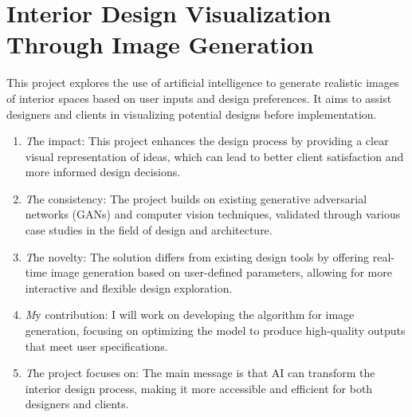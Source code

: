 \documentclass[12pt]{article}
\begin{document}
\section{Interior Design Visualization Through Image Generation}
This project explores the use of artificial intelligence to generate realistic images of interior spaces based on user inputs and design preferences. It aims to assist designers and clients in visualizing potential designs before implementation.
\begin{enumerate}
\item \emph The impact: This project enhances the design process by providing a clear visual representation of ideas, which can lead to better client satisfaction and more informed design decisions.
\item \emph The consistency: The project builds on existing generative adversarial networks (GANs) and computer vision techniques, validated through various case studies in the field of design and architecture.
\item \emph The novelty: The solution differs from existing design tools by offering real-time image generation based on user-defined parameters, allowing for more interactive and flexible design exploration.
\item \emph My contribution: I will work on developing the algorithm for image generation, focusing on optimizing the model to produce high-quality outputs that meet user specifications.
\item \emph The project focuses on: The main message is that AI can transform the interior design process, making it more accessible and efficient for both designers and clients.
\end{enumerate}
\end{document}
